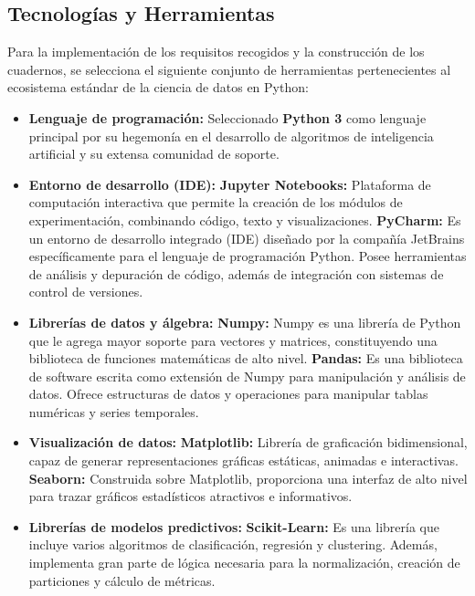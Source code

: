 \subsection{Tecnologías y Herramientas}
Para la implementación de los requisitos recogidos y la construcción de los cuadernos, se selecciona el siguiente conjunto de herramientas pertenecientes al ecosistema estándar de la ciencia de datos en Python:
\begin{itemize}
	\item \textbf{Lenguaje de programación:} Seleccionado \textbf{Python 3} \cite{descarga-python} como lenguaje principal por su hegemonía en el desarrollo de algoritmos de inteligencia artificial y su extensa comunidad de soporte.
	\item \textbf{Entorno de desarrollo (IDE):}
		\subitem \textbf{Jupyter Notebooks:} \cite{descarga-jupyter} Plataforma de computación interactiva que permite la creación de los módulos de experimentación, combinando código, texto y visualizaciones.
		\subitem \textbf{PyCharm:} \cite{descarga-pycharm} Es un entorno de desarrollo integrado (IDE) diseñado por la compañía JetBrains 
		específicamente para el lenguaje de programación Python. Posee herramientas de análisis y depuración de código, además de integración con sistemas de control de versiones.
	\item \textbf{Librerías de datos y álgebra:}
		\subitem \textbf{Numpy:} Numpy \cite{documentacion-numpy} es una librería de Python que le agrega mayor soporte para vectores y matrices, constituyendo una biblioteca de funciones matemáticas de alto nivel.
		\subitem \textbf{Pandas:} \cite{documentacion-pandas} Es una biblioteca de software escrita como extensión de Numpy para manipulación y análisis de datos. Ofrece estructuras de datos y operaciones para manipular tablas numéricas y series temporales.
	\item \textbf{Visualización de datos:}
		\subitem \textbf{Matplotlib:} \cite{documentacion-matplotlib} Librería de graficación bidimensional, capaz de generar representaciones gráficas estáticas, animadas e interactivas.
		\subitem \textbf{Seaborn:} \cite{documentacion-seaborn} Construida sobre Matplotlib, proporciona una interfaz de alto nivel para trazar gráficos estadísticos atractivos e informativos.
	\item \textbf{Librerías de modelos predictivos:}
		\subitem \textbf{Scikit-Learn:} \cite{documentacion-scikit-learn} Es una librería que incluye varios algoritmos de clasificación, regresión y clustering. Además, implementa gran parte de lógica necesaria para la normalización, creación de particiones y cálculo de métricas.

\end{itemize}
